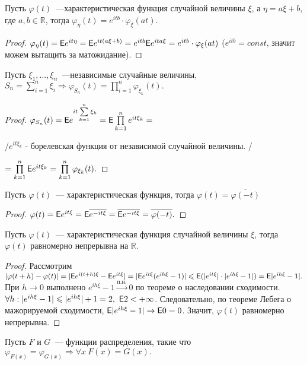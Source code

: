 \begin{property}
		Пусть $\varphi(t)$~---характеристическая функция случайной величины $\xi$, а $\eta = a\xi + b$, где $a, b \in \mathbb{R}$, тогда $\varphi_\eta(t) = e^{itb}\cdot \varphi_\xi(at).$
		\begin{proof}
			$\varphi_\eta(t) = \mathsf{E} e^{it\eta} = \mathsf{E} e^{it(a\xi + b)} = e^{itb} \mathsf{E} e^{ita\xi} = e^{itb}\cdot \varphi_\xi(at)$ ($e^{itb} = const$, значит можем вытащить за матожидание).
		\end{proof}
	\end{property}

	\begin{property}
		Пусть $\xi_1, \ldots, \xi_n$~---независимые случайные величины, $S_n = \sum\limits_{i = 1}^{n}\xi_i \Rightarrow \varphi_{S_n}(t) = \prod\limits_{i = 1}^n\varphi_{\xi_k}(t).$  
		\begin{proof}
			$\varphi_{S_n}(t) = \mathsf{E} e^{it \sum\limits_{k = 1}^{n}\xi_k} = \mathsf{E}\prod\limits_{k = 1}^n e^{it\xi_k} =$ 
			
			/$e^{it\xi_k}$ - борелевская функция от независимой случайной величины. / 
			
			$= \prod\limits_{k = 1}^{n}\mathsf{E} e^{it\xi_k} = \prod\limits_{k = 1}^{n}\varphi_{\xi_k}(t).$
		\end{proof}
	\end{property}
	\begin{property}
		Пусть $\varphi(t)$~--- характеристическая функция, тогда $\varphi(t) = \overline{\varphi(-t)}$
		\begin{proof}
			$\varphi(t) = \mathsf{E} e^{it\xi} = \mathsf{E}\overline{e^{-it\xi}} = \overline{\mathsf{E} e^{-it\xi}} = \overline{\varphi(-t)}.$
		\end{proof}
	\end{property}
	\begin{property}
		Пусть $\varphi(t)$~--- характеристическая функция случайной величины $\xi$, тогда $\varphi(t)$ равномерно непрерывна на $\mathbb{R}.$
		\begin{proof}
			Рассмотрим $|\varphi(t + h) - \varphi(t)| = |\mathsf{E} e^{i(t+h)\xi} - \mathsf{E} e^{it\xi}| = |\mathsf{E} e^{it\xi}(e^{ih\xi} - 1)| \leqslant \mathsf{E} (|e^{it\xi}|\cdot |e^{ih\xi} - 1|) = \mathsf{E} |e^{ih\xi} - 1|.$
			При $h \to 0$ выполнено $e^{ih\xi} - 1 \overset{\text{п.н.}} \longrightarrow 0 $ по теореме о наследовании сходимости. $\forall h: |e^{ih\xi} - 1| \leqslant |e^{ih\xi}| + 1 = 2, ~ \mathsf{E} 2 < +\infty$. Следовательно, по теореме Лебега о мажорируемой сходимости, $\mathsf{E} |e^{ih\xi} - 1| \to \mathsf{E} 0 = 0$. Значит, $\varphi(t)$ равномерно непрерывна.
		\end{proof}
	\end{property}
		\begin{theorem}
		Пусть $F$ и $G$~--- функции распределения, такие что $\varphi_{F(x)} = \varphi_{G(x)} \Rightarrow \forall x\  F(x) = G(x).$
	\end{theorem}
	
